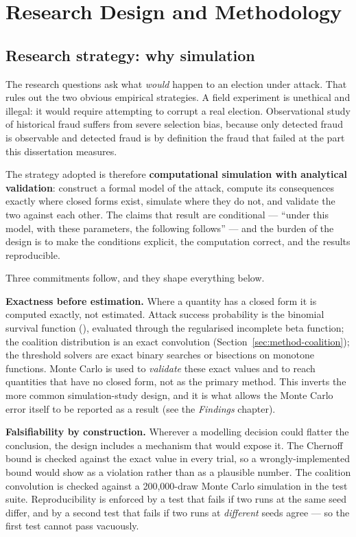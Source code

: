 \section{Research Design and Methodology}
\label{sec:methodology}

\subsection{Research strategy: why simulation}

The research questions ask what \emph{would} happen to an election
under attack. That rules out the two obvious empirical strategies. A
field experiment is unethical and illegal: it would require attempting
to corrupt a real election. Observational study of historical fraud
suffers from severe selection bias, because only detected fraud is
observable and detected fraud is by definition the fraud that failed at
the part this dissertation measures.

The strategy adopted is therefore \textbf{computational simulation with
analytical validation}: construct a formal model of the attack, compute
its consequences exactly where closed forms exist, simulate where they
do not, and validate the two against each other. The claims that result
are conditional --- ``under this model, with these parameters, the
following follows'' --- and the burden of the design is to make the
conditions explicit, the computation correct, and the results
reproducible.

Three commitments follow, and they shape everything below.

\textbf{Exactness before estimation.} Where a quantity has a closed
form it is computed exactly, not estimated. Attack success probability
is the binomial survival function
(), evaluated through the regularised incomplete beta
function; the coalition distribution is an exact convolution
(Section~\ref{sec:method-coalition}); the threshold solvers are exact
binary searches or bisections on monotone functions. Monte Carlo is
used to \emph{validate} these exact values and to reach quantities that
have no closed form, not as the primary method. This inverts the more
common simulation-study design, and it is what allows the Monte Carlo
error itself to be reported as a result
(see the \emph{Findings} chapter).

\textbf{Falsifiability by construction.} Wherever a modelling decision
could flatter the conclusion, the design includes a mechanism that
would expose it. The Chernoff bound is checked against the exact value
in every trial, so a wrongly-implemented bound would show as a
violation rather than as a plausible number. The coalition convolution
is checked against a 200{,}000-draw Monte Carlo simulation in the test
suite. Reproducibility is enforced by a test that fails if two runs at
the same seed differ, and by a second test that fails if two runs at
\emph{different} seeds agree --- so the first test cannot pass
vacuously.

